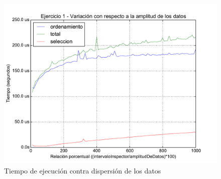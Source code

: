 \documentclass[11pt, a4paper, twoside]{article}
\begin{document}
\clearpage
\begin{figure}[H]
   \begin{center}
   \includegraphics[width=1.4\textwidth,angle=90]{../ej1/graficos/test_3.pdf}
   \caption{Tiempo de ejecución contra dispersión de los datos}
   \label{fig:ej1-3}
   \end{center}
\end{figure}







\end{document}
